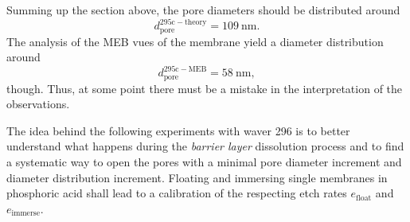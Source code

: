 \documentclass[thesis.tex]{subfiles}
\begin{document}
      Summing up the section above, the pore diameters should be distributed around
      \begin{equation}
          d_\mathrm{pore}^\mathrm{295c-theory} = \SI{109}{\nano\meter}.
      \end{equation}
      The analysis of the MEB vues of the membrane yield a diameter distribution around
      \begin{equation}
          d_\mathrm{pore}^\mathrm{295c-MEB} = \SI{58}{\nano\meter},
      \end{equation}
      though. Thus, at some point there must be a mistake in the interpretation of the observations.
      \medskip

      The idea behind the following experiments with waver 296 is to better understand what happens during the \textit{barrier layer} dissolution process and to find a systematic way to open the pores with a minimal pore diameter increment and diameter distribution increment. Floating and immersing single membranes in phosphoric acid shall lead to a calibration of the respecting etch rates $e_\mathrm{float}$ and $e_\mathrm{immerse}$.
      \medskip
\end{document}
